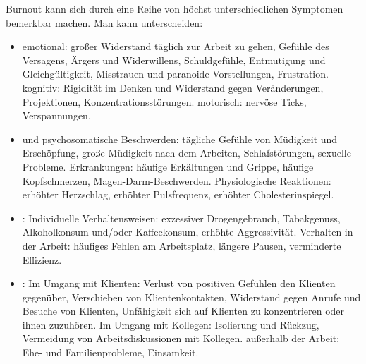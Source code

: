 {Burnout kann sich durch eine Reihe von höchst unterschiedlichen Symptomen bemerkbar machen. 
Man kann unterscheiden:

\begin{itemize}
  \item {}
  emotional: großer Widerstand täglich zur Arbeit zu gehen,
  Gefühle des Versagens, Ärgers und Widerwillens,
  Schuldgefühle, Entmutigung und Gleichgültigkeit, Misstrauen
  und paranoide Vorstellungen, Frustration. kognitiv:
  Rigidität im Denken und Widerstand gegen Veränderungen,
  Projektionen, Konzentrationsstörungen. motorisch: nervöse
  Ticks, Verspannungen.
  \item {} und
  psychosomatische Beschwerden: tägliche Gefühle von Müdigkeit
  und Erschöpfung, große Müdigkeit nach dem Arbeiten,
  Schlafstörungen, sexuelle Probleme. Erkrankungen: häufige
  Erkältungen und Grippe, häufige Kopfschmerzen,
  Magen-Darm-Beschwerden. Physiologische Reaktionen: erhöhter
  Herzschlag, erhöhter Pulsfrequenz, erhöhter Cholesterinspiegel.
  \item {}:
  Individuelle Verhaltensweisen: exzessiver Drogengebrauch,
  Tabakgenuss, Alkoholkonsum und/oder Kaffeekonsum, erhöhte
  Aggressivität. Verhalten in der Arbeit: häufiges Fehlen am
  Arbeitsplatz, längere Pausen, verminderte Effizienz.
  \item {}:
  Im Umgang mit Klienten: Verlust von positiven Gefühlen den
  Klienten gegenüber, Verschieben von Klientenkontakten,
  Widerstand gegen Anrufe und Besuche von Klienten,
  Unfähigkeit sich auf Klienten zu konzentrieren oder ihnen
  zuzuhören. Im Umgang mit Kollegen: Isolierung und Rückzug,
  Vermeidung von Arbeitsdiskussionen mit Kollegen. außerhalb
  der Arbeit: Ehe- und Familienprobleme, Einsamkeit.
  

\end{itemize}}
